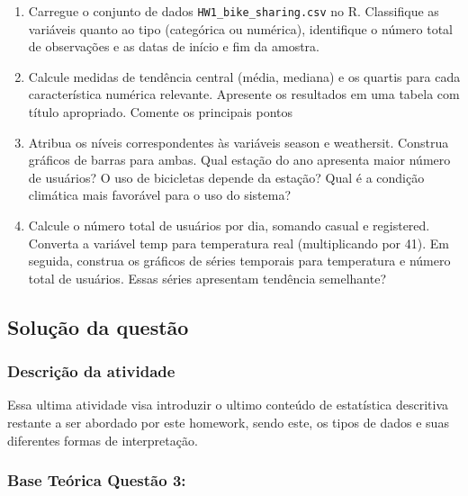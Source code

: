 \documentclass[a4paper,11pt]{article}
\begin{document}
\begin{enumerate}[leftmargin=*]
\item Carregue o conjunto de dados \texttt{HW1\_bike\_sharing.csv}  no R. Classifique as variáveis quanto ao tipo (categórica ou numérica), identifique o número total de observações e as datas de início e fim da amostra.

\item Calcule medidas de tendência central (média, mediana) e os quartis para cada característica numérica relevante. Apresente os resultados em uma tabela com título
apropriado. Comente os principais pontos

\item Atribua os níveis correspondentes às variáveis season e weathersit. Construa gráficos de barras para ambas. Qual estação do ano apresenta maior número de usuários? O uso de bicicletas depende da estação? Qual é a condição climática mais favorável para o uso do sistema?

\item Calcule o número total de usuários por dia, somando casual e registered. Converta
a variável temp para temperatura real (multiplicando por 41). Em seguida, construa os gráficos de séries temporais para temperatura e número total de usuários. Essas séries apresentam tendência semelhante?

\end{enumerate}

\subsection*{Solução da questão} 					

\subsubsection*{Descrição da atividade}
Essa ultima atividade visa introduzir o ultimo conteúdo de estatística descritiva restante a ser abordado por este homework, sendo este, os tipos de dados e suas diferentes formas de interpretação.


\subsubsection*{Base Teórica Questão 3:} 
\end{document}
